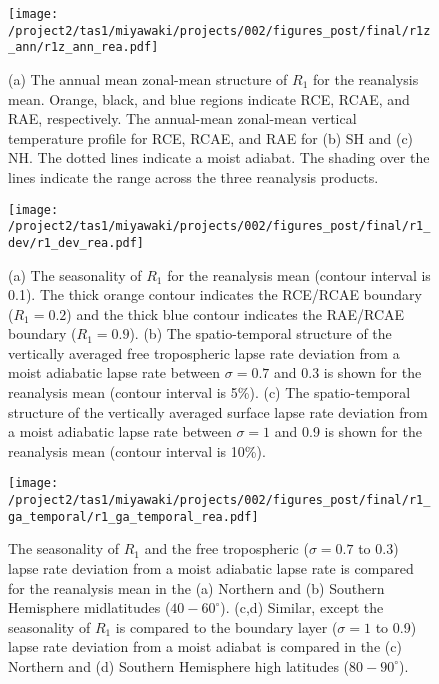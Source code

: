 \documentclass{ametsocV5}
\begin{document}
\begin{figure}[t]
  \noindent\texttt{[image: /project2/tas1/miyawaki/projects/002/figures\_post/final/r1z\_ann/r1z\_ann\_rea.pdf]}\\
  \caption{(a) The annual mean zonal-mean structure of $R_{1}$ for the reanalysis mean. Orange, black, and blue regions indicate RCE, RCAE, and RAE, respectively. The annual-mean zonal-mean vertical temperature profile for RCE, RCAE, and RAE for (b) SH and (c) NH. The dotted lines indicate a moist adiabat. The shading over the lines indicate the range across the three reanalysis products.}
  \label{fig:rea-r1-ann}
\end{figure}

\begin{figure}[t]
  \noindent\texttt{[image: /project2/tas1/miyawaki/projects/002/figures\_post/final/r1\_dev/r1\_dev\_rea.pdf]}\\
  \caption{(a) The seasonality of $R_{1}$ for the reanalysis mean (contour interval is 0.1). The thick orange contour indicates the RCE/RCAE boundary ($R_1=0.2$) and the thick blue contour indicates the RAE/RCAE boundary ($R_1 = 0.9$). (b) The spatio-temporal structure of the vertically averaged free tropospheric lapse rate deviation from a moist adiabatic lapse rate between $\sigma=0.7$ and 0.3 is shown for the reanalysis mean (contour interval is 5\%). (c) The spatio-temporal structure of the vertically averaged surface lapse rate deviation from a moist adiabatic lapse rate between $\sigma=1$ and 0.9 is shown for the reanalysis mean (contour interval is 10\%).}
  \label{fig:rea-r1-dev}
\end{figure}

\begin{figure}[t]
  \noindent\texttt{[image: /project2/tas1/miyawaki/projects/002/figures\_post/final/r1\_ga\_temporal/r1\_ga\_temporal\_rea.pdf]}\\
  \caption{The seasonality of $R_1$ and the free tropospheric ($\sigma=0.7$ to 0.3) lapse rate deviation from a moist adiabatic lapse rate is compared for the reanalysis mean in the (a) Northern and (b) Southern Hemisphere midlatitudes ($40-60^\circ$). (c,d) Similar, except the seasonality of $R_1$ is compared to the boundary layer ($\sigma=1$ to 0.9) lapse rate deviation from a moist adiabat is compared in the (c) Northern and (d) Southern Hemisphere high latitudes ($80-90^\circ$).}
  \label{fig:rea-r1-ga-temporal}
\end{figure}
\end{document}
